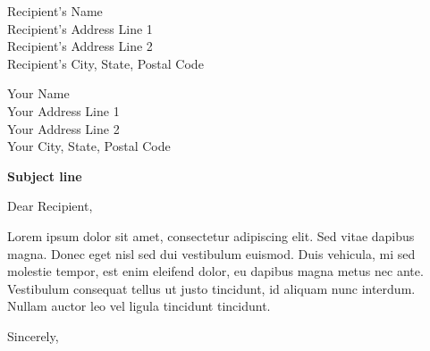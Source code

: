 \documentclass{letter}
\begin{document}
\begin{letter}{\begin{minipage}{0.5\textwidth}
\raggedleft
Recipient's Name \\
Recipient's Address Line 1 \\
Recipient's Address Line 2 \\
Recipient's City, State, Postal Code
\end{minipage}}

\begin{minipage}{0.5\textwidth}
\raggedleft
Your Name \\
Your Address Line 1 \\
Your Address Line 2 \\
Your City, State, Postal Code
\end{minipage}

\bigskip
\textbf{Subject line}


\opening{Dear Recipient,}

Lorem ipsum dolor sit amet, consectetur adipiscing elit. Sed vitae dapibus magna. Donec eget nisl sed dui vestibulum euismod. Duis vehicula, mi sed molestie tempor, est enim eleifend dolor, eu dapibus magna metus nec ante. Vestibulum consequat tellus ut justo tincidunt, id aliquam nunc interdum. Nullam auctor leo vel ligula tincidunt tincidunt. 

\closing{Sincerely,}

\end{letter}
\end{document}
